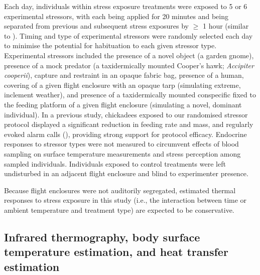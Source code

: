 \documentclass[12pt]{article}
\begin{document}
\noindent Each day, individuals within stress exposure treatments were exposed to 5 or 6 experimental stressors, with each being applied for 20 minutes and being separated from previous and subsequent stress exposures by $\geq$ 1 hour (similar to \citealt{rich_2005}). Timing and type of experimental stressors were randomly selected each day to minimise the potential for habituation to each given stressor type. Experimental stressors included the presence of a novel object (a garden gnome), presence of a mock predator (a taxidermically mounted Cooper's hawk; \textit{Accipiter cooperii}), capture and restraint in an opaque fabric bag, presence of a human, covering of a given flight enclosure with an opaque tarp (simulating extreme, inclement weather), and presence of a taxidermically mounted conspecific fixed to the feeding platform of a given flight enclosure (simulating a novel, dominant individual). In a previous study, chickadees exposed to our randomised stressor protocol displayed a significant reduction in feeding rate and mass, and regularly evoked alarm calls (\citealt{robertson_2020b}), providing strong support for protocol efficacy. Endocrine responses to stressor types were not measured to circumvent effects of blood sampling on surface temperature measurements and stress perception among sampled individuals. Individuals exposed to control treatments were left undisturbed in an adjacent flight enclosure and blind to experimenter presence. \vspace{1cm}    

\noindent Because flight enclosures were not auditorily segregated, estimated thermal responses to stress exposure in this study (i.e., the interaction between time or ambient temperature and treatment type) are expected to be conservative. \vspace{0.5cm}

\subsection{Infrared thermography, body surface temperature estimation, and heat transfer estimation}
\vspace{0.5cm}
\end{document}
